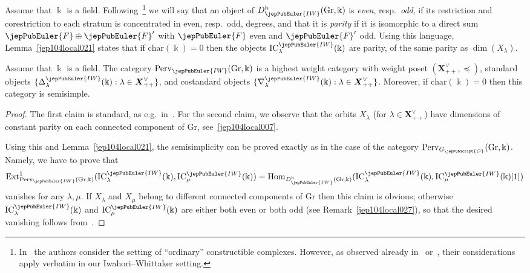 \begin{rmk}
\label{jep104local027}
Assume that $\Bbbk$ is a field.
Following~\cite{jep104ref31}\footnote{In~\cite{jep104ref31} the authors consider the setting of ``ordinary'' constructible complexes. However, as observed already in~\cite[\S 11.1]{jep104ref42} or~\cite[\S 6.2]{jep104ref02}, their considerations apply verbatim in our Iwahori--Whittaker setting.} we will say that an object of $D^{\mathrm{b}}_{\jepPubEuler{IW}}(\mathrm{Gr}, \Bbbk)$ is \emph{even}, resp.~\emph{odd}, if its restriction and corestriction to each stratum is concentrated in even, resp.~odd, degrees, and that it is \emph{parity} if it is isomorphic to a direct sum $\jepPubEuler{F} \oplus \jepPubEuler{F}'$ with $\jepPubEuler{F}$ even and $\jepPubEuler{F}'$ odd. Using this language, Lemma~\ref{jep104local021} states that if $\mathrm{char}(\Bbbk)=0$ then the objects $\mathrm{IC}^{\jepPubEuler{IW}}_\lambda(\Bbbk)$ are parity, of the same parity as $\dim(X_\lambda)$.
\end{rmk}

\begin{cor}
\label{jep104local001}
Assume that $\Bbbk$ is a field.
The category $\mathrm{Perv}_{\jepPubEuler{IW}}(\mathrm{Gr}, \Bbbk)$ is a highest weight category with weight poset $(\boldsymbol{X}^\vee_{++}, \preccurlyeq)$, standard objects $\{\Delta_\lambda^{\jepPubEuler{IW}}(\Bbbk) : \lambda \in \boldsymbol{X}^\vee_{++}\}$, and costandard objects $\{\nabla^{\jepPubEuler{IW}}_\lambda(\Bbbk) : \lambda \in \boldsymbol{X}^\vee_{++}\}$. Moreover, if $\mathrm{char}(\Bbbk)=0$ then this category is semisimple.
\end{cor}

\begin{proof}
The first claim is standard, as e.g.~in~\cite[\S 3.3]{jep104ref14}. For the second claim, we observe that the orbits $X_\lambda$ (for $\lambda\in\boldsymbol{X}^\vee_{++}$) have dimensions of constant parity on each connected component of $\mathrm{Gr}$, see~\eqref{jep104local007}. 

Using this and Lemma~\ref{jep104local021},
the semisimplicity can be proved exactly as in the case of the category $\mathrm{Perv}_{G_{\jepPubScript{O}}}(\mathrm{Gr}, \Bbbk)$. Namely, we have to prove that
\[
\operatorname{Ext}^1_{\mathrm{Perv}_{\jepPubEuler{IW}}(\mathrm{Gr}, \Bbbk)}(\mathrm{IC}^{\jepPubEuler{IW}}_\lambda(\Bbbk),\mathrm{IC}^{\jepPubEuler{IW}}_\mu(\Bbbk))=\operatorname{Hom}_{D^{\mathrm{b}}_{\jepPubEuler{IW}}(\mathrm{Gr}, \Bbbk)}(\mathrm{IC}^{\jepPubEuler{IW}}_\lambda(\Bbbk),\mathrm{IC}^{\jepPubEuler{IW}}_\mu(\Bbbk)[1])
\]
vanishes for any $\lambda,\mu$. If $X_\lambda$ and $X_\mu$ belong to different connected components of $\mathrm{Gr}$ then this claim is obvious; otherwise $\mathrm{IC}^{\jepPubEuler{IW}}_\lambda(\Bbbk)$ and $\mathrm{IC}^{\jepPubEuler{IW}}_\mu(\Bbbk)$ are either both even or both odd (see Remark~\ref{jep104local027}), so that the desired vanishing follows from~\cite[Cor.~2.8]{jep104ref31}.

\end{proof}

